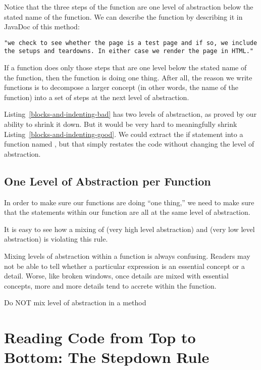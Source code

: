 Notice that the three steps of the function are one level of abstraction below the stated name of the function. We can describe the function by describing it in JavaDoc of this method:

\begin{lstlisting}
"we check to see whether the page is a test page and if so, we include the setups and teardowns. In either case we render the page in HTML."
\end{lstlisting}

If a function does only those steps that are one level below the stated name of the function, then the function is doing one thing. After all, the reason we write functions is to decompose a larger concept (in other words, the name of the function) into a set of steps at the next level of abstraction.

Listing~\ref{blocks-and-indenting-bad} has two levels of abstraction, as proved by our ability to shrink it down. But it would be very hard to meaningfully shrink Listing~\ref{blocks-and-indenting-good}. We could extract the if statement into a function named , but that simply restates the code without changing the level of abstraction.

\subsection{One Level of Abstraction per Function}

In order to make sure our functions are doing “one thing,” we need to make sure that the statements within our function are all at the same level of abstraction.

It is easy to see how a mixing of  (very high level abstraction) and  (very low level abstraction) is violating this rule.

Mixing levels of abstraction within a function is always confusing. Readers may not be able to tell whether a particular expression is an essential concept or a detail. Worse, like broken windows, once details are mixed with essential concepts, more and more details tend to accrete within the function.

\begin{marker}
Do NOT mix level of abstraction in a method
\end{marker}

\section{Reading Code from Top to Bottom: The Stepdown Rule}

